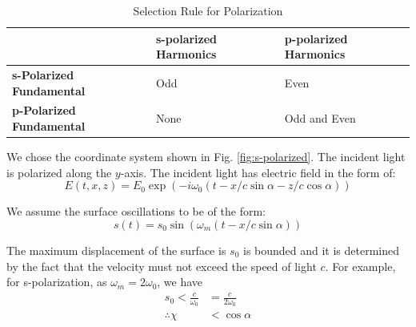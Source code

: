 \begin{table}[h]
    \centering
    \caption{Selection Rule for Polarization}
    \vspace{0.5cm}
    \label{tab:selection-rule}
    \begin{tabular}{|l|l|l|}
        \hline
                                         & \textbf{s-polarized Harmonics} & \textbf{p-polarized Harmonics} \\ \hline
        \textbf{s-Polarized Fundamental} & Odd                            & Even                           \\ \hline
        \textbf{p-Polarized Fundamental} & None                           & Odd and Even                   \\ \hline
    \end{tabular}
\end{table}

We chose the coordinate system shown in Fig. \ref{fig:s-polarized}. The incident light is polarized along the $y$-axis. The incident light has electric field in the form of:
\begin{equation*}
    E(t, x, z) = E_0 \exp\left(-i\omega_0\left(t-x/c \sin\alpha - z/c \cos\alpha\right)\right)
\end{equation*}

We assume the surface oscillations to be of the form:
\begin{equation*}
    s(t) = s_0 \sin\left( \omega_m \left(t - x/c \sin\alpha\right) \right)
\end{equation*}

The maximum displacement of the surface is $s_0$ is bounded and it is determined by the fact that the velocity must not exceed the speed of light $c$. For example, for s-polarization, as $\omega_m = 2 \omega_0$, we have
\begin{align*}
    s_0 < \frac{c}{\omega_0} & = \frac{c}{2\omega_0} \\
    \therefore \chi          & < \cos\alpha
\end{align*}




